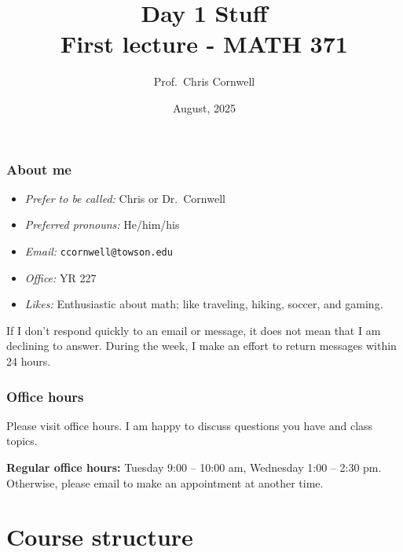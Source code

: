 \documentclass{beamer}
\author{Prof.\ Chris Cornwell}
\date{August, 2025}
\title{Day 1 Stuff \\ {\small First lecture - MATH 371}}
\institute{Towson University, Dept.\ of Mathematics}
\theoremstyle{example}
\newcommand{\ttt}[1]{{\small\texttt{#1}}}
\begin{document}
\begin{frame}
\titlepage
\end{frame}

\begin{frame}
\frametitle{About me}
\begin{itemize}
    \item \textit{Prefer to be called:} Chris or Dr.~Cornwell
    \item \textit{Preferred pronouns:} He/him/his
    \item \textit{Email:} \ttt{ccornwell@towson.edu}
    \item \textit{Office:} YR 227
    \item \textit{Likes:} Enthusiastic about math; like traveling, hiking, soccer, and gaming.
\end{itemize}

\vspace*{24pt}
\pause
If I don't respond quickly to an email or message, it does not mean that I am declining to answer. During the week, I make an effort to return messages within 24 hours. 
\end{frame}

\begin{frame}
\frametitle{Office hours}

Please visit office hours. I am happy to discuss questions you have and class topics.

\vspace*{12pt}
\textbf{Regular office hours:} Tuesday 9:00 {--} 10:00 am, Wednesday 1:00 {--} 2:30 pm. Otherwise, please email to make an appointment at another time.

\vfill
\end{frame}

\section{Course structure}
\end{document}
